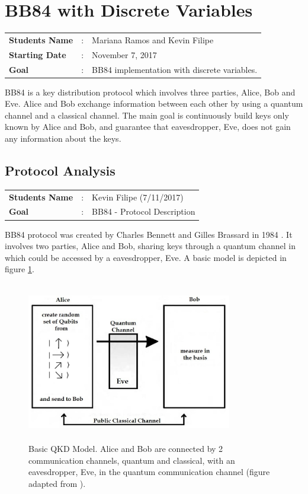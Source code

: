\clearpage
\section{BB84 with Discrete Variables}

\begin{tcolorbox}	
\begin{tabular}{p{2.75cm} p{0.2cm} p{10.5cm}} 	
\textbf{Students Name}  &:& Mariana Ramos and Kevin Filipe\\
\textbf{Starting Date} &:& November 7, 2017\\
\textbf{Goal}          &:& BB84 implementation with discrete variables.
\end{tabular}
\end{tcolorbox}

BB84 is a key distribution protocol which involves three parties, Alice, Bob and Eve. Alice and Bob exchange information between each other by using a quantum channel and a classical channel. The main goal is continuously build keys only known by Alice and Bob, and guarantee that eavesdropper, Eve, does not gain any information about the keys.


\subsection{Protocol Analysis}
\begin{tcolorbox}	
	\begin{tabular}{p{2.75cm} p{0.2cm} p{10.5cm}} 	
		\textbf{Students Name}  &:& Kevin Filipe (7/11/2017)\\
		\textbf{Goal}          &:& BB84 - Protocol Description
	\end{tabular}
\end{tcolorbox}

BB84 protocol was created by Charles Bennett and Gilles Brassard in 1984 \cite{BB84}. It involves two parties, Alice and Bob, sharing keys through a quantum channel in which could be accessed by a eavesdropper, Eve. A basic model is depicted in figure \ref{fig:qkd model}.

\begin{figure}[H]
	\centering
	\includegraphics[width=0.8\textwidth,height=7cm]{./sdf/bb84_with_discrete_variables/figures/QKD_Model.png}
	\caption{Basic QKD Model. Alice and Bob are connected by 2 communication channels, quantum and classical, with an eavesdropper, Eve, in the quantum communication channel (figure adapted from \cite{iqo}).}\label{fig:qkd model}
\end{figure}

